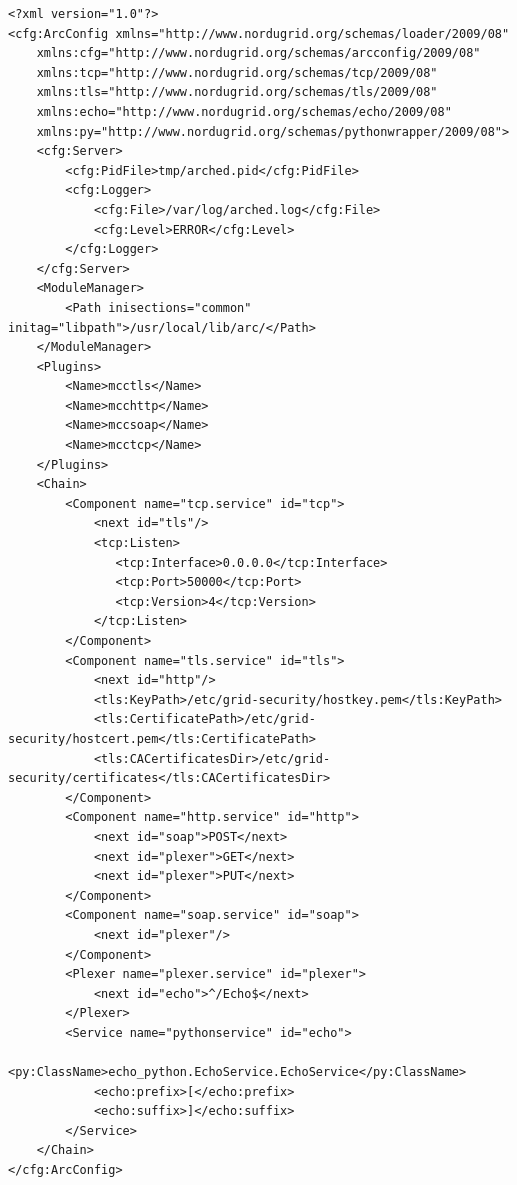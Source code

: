 \documentclass{article}
\begin{document}
\begin{verbatim}
<?xml version="1.0"?>
<cfg:ArcConfig xmlns="http://www.nordugrid.org/schemas/loader/2009/08"
	xmlns:cfg="http://www.nordugrid.org/schemas/arcconfig/2009/08"
	xmlns:tcp="http://www.nordugrid.org/schemas/tcp/2009/08"
	xmlns:tls="http://www.nordugrid.org/schemas/tls/2009/08"
	xmlns:echo="http://www.nordugrid.org/schemas/echo/2009/08"
	xmlns:py="http://www.nordugrid.org/schemas/pythonwrapper/2009/08">
    <cfg:Server>
        <cfg:PidFile>tmp/arched.pid</cfg:PidFile>
        <cfg:Logger>
            <cfg:File>/var/log/arched.log</cfg:File>
            <cfg:Level>ERROR</cfg:Level>
        </cfg:Logger>
    </cfg:Server>
    <ModuleManager>
        <Path inisections="common" initag="libpath">/usr/local/lib/arc/</Path>
    </ModuleManager>
    <Plugins>
        <Name>mcctls</Name>
        <Name>mcchttp</Name>
        <Name>mccsoap</Name>
        <Name>mcctcp</Name>
    </Plugins>
    <Chain>
        <Component name="tcp.service" id="tcp">
            <next id="tls"/>
            <tcp:Listen>
               <tcp:Interface>0.0.0.0</tcp:Interface>
               <tcp:Port>50000</tcp:Port>
               <tcp:Version>4</tcp:Version>
            </tcp:Listen>
        </Component>
        <Component name="tls.service" id="tls">
            <next id="http"/>
            <tls:KeyPath>/etc/grid-security/hostkey.pem</tls:KeyPath>
            <tls:CertificatePath>/etc/grid-security/hostcert.pem</tls:CertificatePath>
            <tls:CACertificatesDir>/etc/grid-security/certificates</tls:CACertificatesDir>
        </Component>
        <Component name="http.service" id="http">
            <next id="soap">POST</next>
            <next id="plexer">GET</next>
            <next id="plexer">PUT</next>
        </Component>
        <Component name="soap.service" id="soap">
            <next id="plexer"/>
        </Component>
        <Plexer name="plexer.service" id="plexer">
            <next id="echo">^/Echo$</next>
        </Plexer>
        <Service name="pythonservice" id="echo">
            <py:ClassName>echo_python.EchoService.EchoService</py:ClassName>
            <echo:prefix>[</echo:prefix>
            <echo:suffix>]</echo:suffix>
        </Service>
    </Chain>
</cfg:ArcConfig>
\end{verbatim}
\end{document}
